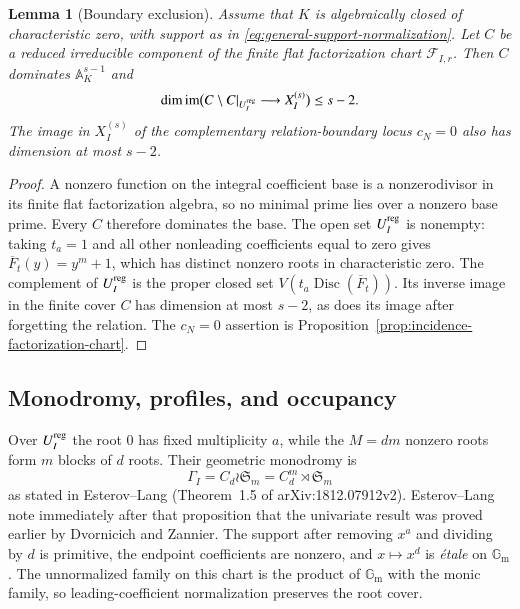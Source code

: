 \documentclass[10pt,fleqn]{article}
\numberwithin{equation}{section}
\newtheorem{lemma}[theorem]{Lemma}
\newcommand{\A}{\mathbb A}
\newcommand{\Gm}{\mathbb G_{\mathrm m}}
\newcommand{\cF}{\mathcal F}
\newcommand{\Disc}{\operatorname{Disc}}
\begin{document}
\begin{lemma}[Boundary exclusion]\label{lem:profile-boundary-exclusion}
Assume that $K$ is algebraically closed of characteristic zero, with support as in
\eqref{eq:general-support-normalization}.
Let $C$ be a reduced irreducible component of the finite flat factorization chart
$\cF_{I,r}$.  Then $C$ dominates $\A_K^{s-1}$ and
\begin{equation}\label{eq:profile-boundary-image-bound}
 \dim\operatorname{im}\bigl(C\setminus C|_{U_I^{\rm reg}}\longrightarrow X_I^{(s)}\bigr)
 \le s-2.
\end{equation}
The image in $X_I^{(s)}$ of the complementary
relation-boundary locus $c_N=0$ also has dimension at most $s-2$.
\end{lemma}

\begin{proof}
A nonzero function on the integral coefficient base is a nonzerodivisor
in its finite flat factorization algebra, so no minimal prime lies
over a nonzero base prime.  Every $C$ therefore dominates the base.
The open set $U_I^{\rm reg}$ is nonempty: taking $t_a=1$
and all other nonleading coefficients equal to zero gives
$\overline F_t(y)=y^m+1$, which has distinct nonzero roots
in characteristic zero.
The complement of $U_I^{\rm reg}$ is the proper closed set
$V(t_a\Disc(\overline F_t))$.  Its inverse image in the finite cover $C$
has dimension at most $s-2$, as does its image after forgetting the
relation.  The $c_N=0$ assertion is
Proposition~\ref{prop:incidence-factorization-chart}.
\end{proof}

\subsection{Monodromy, profiles, and occupancy}

Over $U_I^{\rm reg}$ the root $0$ has fixed multiplicity $a$, while the
$M=dm$ nonzero roots form $m$ blocks of $d$ roots.  Their geometric monodromy is
\begin{equation}\label{eq:sparse-root-monodromy}
 \Gamma_I=C_d\wr\mathfrak S_m=C_d^m\rtimes\mathfrak S_m
\end{equation}
as stated in Esterov--Lang \cite[Proposition~1.5]{EsterovLang}
(Theorem~1.5 of arXiv:1812.07912v2).
Esterov--Lang note immediately after that proposition that the
univariate result was proved earlier by Dvornicich and Zannier.
The support after removing $x^a$ and dividing by $d$ is primitive,
the endpoint coefficients are nonzero, and $x\mapsto x^d$ is
\emph{\'etale} on $\Gm$.  The unnormalized family on this chart
is the product of $\Gm$ with the monic family, so leading-coefficient
normalization preserves the root cover.
\end{document}
